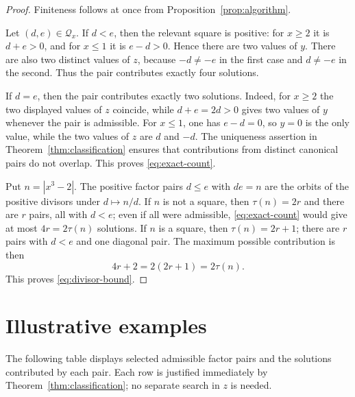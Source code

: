 \documentclass[11pt,a4paper]{article}
\theoremstyle{definition}
\theoremstyle{remark}
\begin{document}
\begin{proof}
Finiteness follows at once from Proposition~\ref{prop:algorithm}.

Let $(d,e)\in\mathcal Q_x$.  If $d<e$, then the relevant square is positive:
for $x\geq2$ it is $d+e>0$, and for $x\leq1$ it is $e-d>0$.  Hence there are
two values of $y$.  There are also two distinct values of $z$, because
$-d\neq-e$ in the first case and $d\neq-e$ in the second.  Thus the pair
contributes exactly four solutions.

If $d=e$, then the pair contributes exactly two solutions.  Indeed, for
$x\geq2$ the two displayed values of $z$ coincide, while $d+e=2d>0$ gives
two values of $y$ whenever the pair is admissible.  For $x\leq1$, one has
$e-d=0$, so $y=0$ is the only value, while the two values of $z$ are $d$ and
$-d$.  The uniqueness assertion in Theorem~\ref{thm:classification} ensures
that contributions from distinct canonical pairs do not overlap.  This
proves \eqref{eq:exact-count}.

Put $n=|x^3-2|$.  The positive factor pairs $d\leq e$ with $de=n$ are the
orbits of the positive divisors under $d\mapsto n/d$.  If $n$ is not a
square, then $\tau(n)=2r$ and there are $r$ pairs, all with $d<e$; even if all
were admissible, \eqref{eq:exact-count} would give at most
$4r=2\tau(n)$ solutions.  If $n$ is a square, then $\tau(n)=2r+1$; there are
$r$ pairs with $d<e$ and one diagonal pair.  The maximum possible
contribution is then
\[
 4r+2=2(2r+1)=2\tau(n).
\]
This proves \eqref{eq:divisor-bound}.
\end{proof}

\section{Illustrative examples}

The following table displays selected admissible factor pairs and the
solutions contributed by each pair.  Each row is justified immediately by
Theorem~\ref{thm:classification}; no separate search in $z$ is needed.
\end{document}
